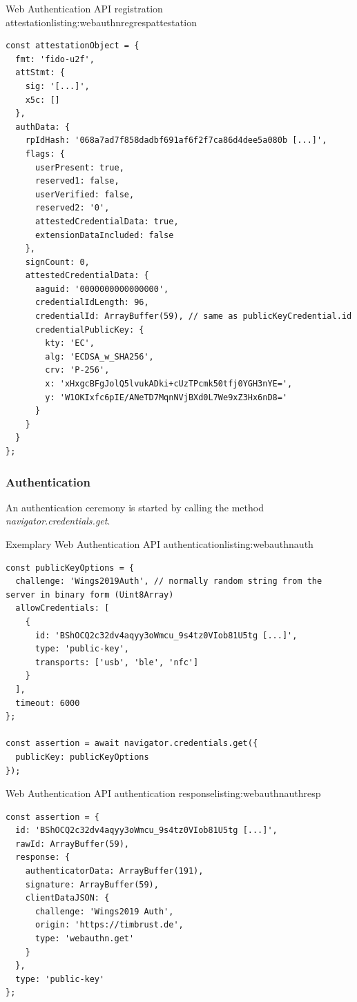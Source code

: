 \begin{example}{Web Authentication API registration attestation}{listing:webauthnregrespattestation}
\begin{verbatim}
const attestationObject = {
  fmt: 'fido-u2f',
  attStmt: {
    sig: '[...]',
    x5c: []
  },
  authData: {
    rpIdHash: '068a7ad7f858dadbf691af6f2f7ca86d4dee5a080b [...]',
    flags: {
      userPresent: true,
      reserved1: false,
      userVerified: false,
      reserved2: '0',
      attestedCredentialData: true,
      extensionDataIncluded: false
    },
    signCount: 0,
    attestedCredentialData: {
      aaguid: '0000000000000000',
      credentialIdLength: 96,
      credentialId: ArrayBuffer(59), // same as publicKeyCredential.id
      credentialPublicKey: {
        kty: 'EC',
        alg: 'ECDSA_w_SHA256',
        crv: 'P-256',
        x: 'xHxgcBFgJolQ5lvukADki+cUzTPcmk50tfj0YGH3nYE=',
        y: 'W1OKIxfc6pIE/ANeTD7MqnNVjBXd0L7We9xZ3Hx6nD8='
      }
    }
  }
};
\end{verbatim}
\end{example}

\subsubsection{Authentication}

An authentication ceremony is started by calling the method \textit{navigator.credentials.get}.
\\
\begin{example}{Exemplary Web Authentication API authentication}{listing:webauthnauth}
\begin{verbatim}
const publicKeyOptions = {
  challenge: 'Wings2019Auth', // normally random string from the server in binary form (Uint8Array)
  allowCredentials: [
    {
      id: 'BShOCQ2c32dv4aqyy3oWmcu_9s4tz0VIob81U5tg [...]',
      type: 'public-key',
      transports: ['usb', 'ble', 'nfc']
    }
  ],
  timeout: 6000
};

const assertion = await navigator.credentials.get({
  publicKey: publicKeyOptions
});
\end{verbatim}
\end{example}

\begin{example}{Web Authentication API authentication response}{listing:webauthnauthresp}
\begin{verbatim}
const assertion = {
  id: 'BShOCQ2c32dv4aqyy3oWmcu_9s4tz0VIob81U5tg [...]',
  rawId: ArrayBuffer(59),
  response: {
    authenticatorData: ArrayBuffer(191),
    signature: ArrayBuffer(59),
    clientDataJSON: {
      challenge: 'Wings2019 Auth',
      origin: 'https://timbrust.de',
      type: 'webauthn.get'
    }
  },
  type: 'public-key'
};
\end{verbatim}
\end{example}